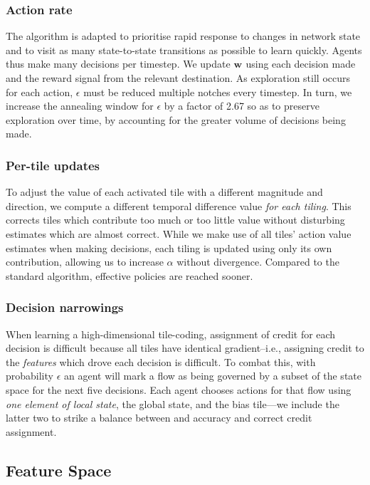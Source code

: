 \documentclass[10pt, times, conference, letterpaper]{IEEEtran}
\newcommand{\wvec}[1]{\ensuremath{\bm{w}_{#1}}}
\begin{document}
\subsubsection{Action rate}
The algorithm is adapted to prioritise rapid response to changes in network state and to visit as many state-to-state transitions as possible to learn quickly.
Agents thus make many decisions per timestep.
We update $\wvec{}$ using each decision made and the reward signal from the relevant destination.
As exploration still occurs for each action, $\epsilon$ must be reduced multiple notches every timestep.
In turn, we increase the annealing window for $\epsilon$ by a factor of \num{2.67} so as to preserve exploration over time, by accounting for the greater volume of decisions being made.

\subsubsection{Per-tile updates}
To adjust the value of each activated tile with a different magnitude and direction, we compute a different temporal difference value \emph{for each tiling}.
This corrects tiles which contribute too much or too little value without disturbing estimates which are almost correct.
While we make use of all tiles' action value estimates when making decisions, each tiling is updated using only its own contribution, allowing us to increase $\alpha$ without divergence.
Compared to the standard algorithm, effective policies are reached sooner.

\subsubsection{Decision narrowings}
When learning a high-dimensional tile-coding, assignment of credit for each decision is difficult because all tiles have identical gradient--i.e., assigning credit to the \emph{features} which drove each decision is difficult.
To combat this, with probability $\epsilon$ an agent will mark a flow as being governed by a subset of the state space for the next five decisions.
Each agent chooses actions for that flow using \emph{one element of local state}, the global state, and the bias tile---we include the latter two to strike a balance between and accuracy and correct credit assignment.

\subsection{Feature Space}\label{sec:feature-space}
\end{document}
